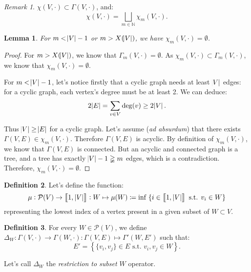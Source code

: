 \documentclass{article}
\newtheorem{lemma}{Lemma}[section]
\theoremstyle{definition}
\newtheorem{definition}[lemma]{Definition}
\theoremstyle{remark}
\newtheorem*{remark}{Remark}
\newcommand{\N}{\mathbb N}
\newcommand{\intint}[2]{\left\llbracket#1, \, #2\right\rrbracket}
\newcommand{\st}{\text{ s.t. }}
\begin{document}
		\begin{remark} $\chi(V, \cdot) \subset \Gamma(V, \cdot)$, and:
		\[\chi(V, \cdot) = \bigsqcup_{m \in \N}\chi_m(V, \cdot).\]
		\end{remark}

		\begin{lemma} For $m < \abs V-1$ or $m > X(\abs V)$, we have $\chi_m(V, \cdot) = \emptyset$.
		\end{lemma}

		\begin{proof} For $m > X(\abs V)$, we know that $\Gamma_m(V, \cdot) = \emptyset$. As $\chi_m(V, \cdot) \subset \Gamma_m(V, \cdot)$, we know that
		$\chi_m(V, \cdot) = \emptyset$.

		For $m < \abs V-1$, let's notice firstly that a cyclic graph needs at least $\abs V$ edges: for a cyclic graph, each vertex's degree must be at least 2. We
		can deduce:
		\[2\abs E = \sum_{v \in V}\deg(v) \geq 2\abs V.\]

		Thus $\abs V \geq \abs E$ for a cyclic graph. Let's assume (\textit{ad absurdum}) that there exists $\Gamma(V, E) \in \chi_m(V, \cdot)$. Therefore $\Gamma(V, E)$ is acyclic.
		By definition of $\chi_m(V, \cdot)$, we know that $\Gamma(V, E)$ is connected. But an acyclic and connected graph is a tree, and a tree has exactly
		$\abs V-1 \gneqq m$ edges, which is a contradiction. Therefore, $\chi_m(V, \cdot) = \emptyset$.
		\end{proof}

		\begin{definition}\label{def:mu function} Let's define the function:
		\[\mu : \mathcal P(V) \to \intint 1{\abs V} : W \mapsto \mu(W) \coloneqq \inf\; \{i \in \intint 1{\abs V} \st v_i \in W\}\]
		representing the lowest index of a vertex present in a given subset of $W \subset V$.
		\end{definition}

		\begin{definition} For every $W \in \mathcal P(V)$, we define $\Delta_W : \Gamma(V, \cdot) \to \Gamma(W, \cdot) : \Gamma(V, E) \mapsto \Gamma'(W, E')$
		such that:
		\[E' = \left\{\{v_i, v_j\} \in E \st v_i, v_j \in W\right\}.\]

		Let's call $\Delta_W$ the \textit{restriction to subset $W$} operator.
		\end{definition}
\end{document}
